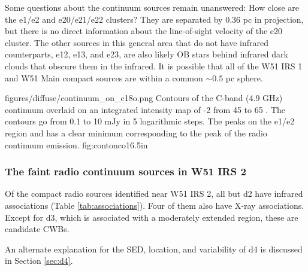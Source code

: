 Some questions about the continuum sources remain unanswered: How close are the
e1/e2 and e20/e21/e22 clusters?  They are separated by 0.36 pc in projection,
but there is no direct information about the line-of-sight velocity of the e20
cluster.    The other sources in this general area that do not have infrared
counterparts, e12, e13, and e23, are also likely OB stars behind
infrared dark clouds that obscure them in the infrared.  It is possible that
all of the W51 IRS 1 and W51 Main compact sources are within a common $\sim
0.5$ pc sphere.


\Figure
{figures/diffuse/continuum_on_c18o.png}
{Contours of the C-band (4.9 GHz) continuum overlaid on an integrated intensity
map of -2 from 45 to 65 \kms \citep{Parsons2012a}.  The contours
go from 0.1 to 10 mJy in 5 logarithmic steps.  The \ceighteeno peaks on the
e1/e2 region and has a clear minimum corresponding to the peak of the radio
continuum emission.
}
{fig:contonco}{1}{6.5in}

\subsubsection{The faint radio continuum sources in W51 IRS 2}

Of the compact radio sources identified near W51 IRS 2, all but d2 have infrared
associations (Table \ref{tab:associations}).  Four of them also have X-ray
associations.  Except for d3, which is associated with a moderately
extended \hii region, these are candidate CWBs.

An alternate explanation for the SED, location, and variability of d4 is
discussed in Section \ref{sec:d4}.



